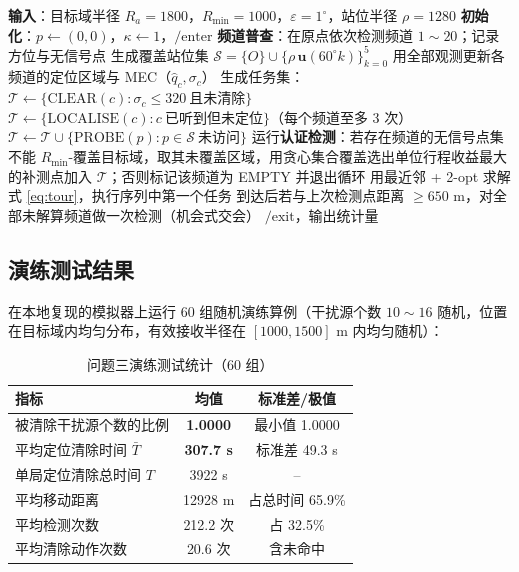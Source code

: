 \documentclass{cumcmthesis}
\begin{document}
\begin{algorithm}[H]
\caption{问题三：全向干扰源搜索—定位—清除算法（CTC-V）}
\begin{algorithmic}[1]
\State \textbf{输入}：目标域半径 $R_a=1800$，$R_{\min}=1000$，$\varepsilon=1^{\circ}$，站位半径 $\rho=1280$
\State \textbf{初始化}：$p\gets(0,0)$，$\kappa\gets1$，$\text{/enter}$
\State \textbf{频道普查}：在原点依次检测频道 $1\sim20$；记录方位与无信号点
\State 生成覆盖站位集 $\mathcal S=\{O\}\cup\{\rho\,\mathbf u(60^{\circ}k)\}_{k=0}^{5}$
   \State 用全部观测更新各频道的定位区域与 MEC（$\hat q_c,\sigma_c$）
   \State 生成任务集：$\mathcal T\gets\{\text{CLEAR}(c):\sigma_c\le320\ \text{且未清除}\}$
      \State $\mathcal T\gets\{\text{LOCALISE}(c):c\ \text{已听到但未定位}\}$（每个频道至多 3 次）
   \EndIf
   \State $\mathcal T\gets\mathcal T\cup\{\text{PROBE}(p):p\in\mathcal S\ \text{未访问}\}$
      \State 运行\textbf{认证检测}：若存在频道的无信号点集不能 $R_{\min}$-覆盖目标域，取其未覆盖区域，用贪心集合覆盖选出单位行程收益最大的补测点加入 $\mathcal T$；否则标记该频道为 EMPTY 并退出循环
   \EndIf
   \State 用最近邻 + 2-opt 求解式 \eqref{eq:tour}，执行序列中第一个任务
   \State 到达后若与上次检测点距离 $\ge650$ m，对全部未解算频道做一次检测（机会式交会）
\EndWhile
\State $\text{/exit}$，输出统计量
\end{algorithmic}
\end{algorithm}

\subsection{演练测试结果}

在本地复现的模拟器上运行 60 组随机演练算例（干扰源个数 $10\sim16$ 随机，位置在目标域内均匀分布，有效接收半径在 $[1000,1500]$ m 内均匀随机）：

\begin{table}[H]
\centering
\caption{问题三演练测试统计（60 组）}
\label{tab:q3drill}
\begin{tabular}{lcc}
\toprule
指标 & 均值 & 标准差/极值\\
\midrule
被清除干扰源个数的比例 & \textbf{1.0000} & 最小值 1.0000\\
平均定位清除时间 $\bar T$ & \textbf{307.7 s} & 标准差 49.3 s\\
单局定位清除总时间 $T$ & 3922 s & --\\
平均移动距离 & 12928 m & 占总时间 65.9\%\\
平均检测次数 & 212.2 次 & 占 32.5\%\\
平均清除动作次数 & 20.6 次 & 含未命中\\
\bottomrule
\end{tabular}
\end{table}
\end{document}
